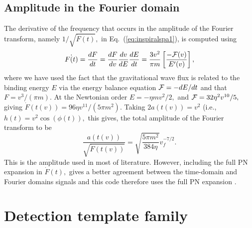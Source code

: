\subsection{Amplitude in the Fourier domain}
The derivative of the frequency that occurs in the
amplitude of the Fourier transform, namely
$1/\sqrt{\dot{F}(t)},$ in Eq.~(\ref{eq:inspiralspa1}),
is computed using
\begin{equation}
\dot{F(t)} = \frac{dF}{dt}
           = \frac{dF}{dv}\frac{dv}{dE}\frac{dE}{dt}
           = \frac{3v^2}{\pi m}\left [\frac{{-\cal F}(v)}{E'(v)} \right ],
\end{equation}
where we have used the fact that the gravitational wave flux
is related to the binding energy $E$ via the energy balance equation
${\cal F} = -dE/dt$ and that $F=v^3/(\pi m).$
At the Newtonian order $E=-\eta m v^2/2,$ and ${\cal F} = 32\eta^2 v^{10}/5,$
giving $\dot{F}(t(v)) = 96\eta v^{11}/(5\pi m^2).$ Taking
$2a(t(v)) = v^2$ (i.e., $h(t) = v^2 \cos (\phi(t)),$ this gives, the
total amplitude of the Fourier transform to be
$$\frac{a(t(v))}{\sqrt{\dot{F}(t(v))}} =  \sqrt{\frac{5\pi m^2}{384\eta}} v_f^{-7/2}.$$
This is the amplitude used in most of literature. However, including the
full PN expansion in $\dot{F}(t),$ gives a better agreement between the
time-domain and Fourier domains signals and this code therefore uses the full
PN expansion \cite{dis2}.

\section{Detection template family}
\label{sec:BCV}

